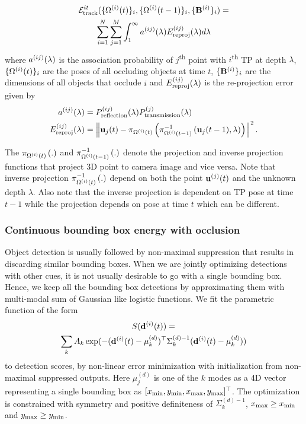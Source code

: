 \begin{multline}
  \mathcal{E}^{it}_{\text{track}}(\{ \Omega^{(i)}(t) \}_i, \{ \Omega^{(i)}(t-1) \}_i, \{\mathbf{B}^{(i)}\}_i ) = 
  \\
    \sum_{i=1}^{N} 
    \sum_{j = 1}^{M}
    \int_1^\infty a^{(ij)}(\lambda)E^{(ij)}_{\text{reproj}}(\lambda) d\lambda
\end{multline}
where $a^{(ij)}(\lambda)$ is the association probability of
$j$\textsuperscript{th} point with $i$\textsuperscript{th} TP at depth $\lambda$, $\{ \Omega^{(i)}(t) \}_i$ are the poses of all occluding objects at time $t$, $ \{ \mathbf{B}^{(i)} \}_i$ are the dimensions of all objects that occlude $i$
and $E^{(ij)}_{\text{reproj}}(\lambda)$ is the re-projection error given by
%
\begin{align}
  a^{(ij)}(\lambda) &= P^{(ij)}_{\text{reflection}}(\lambda)P^{(j)}_{\text{transmission}}(\lambda)\\
  E^{(ij)}_{\text{reproj}}(\lambda) &= \left\|\mathbf{u}_j(t) - \pi_{\Omega^{(i)}(t)}\left(\pi^{-1}_{\Omega^{(i)}(t-1)}\left(\mathbf{u}_j(t-1), \lambda\right)\right)\right\|^2 .
  \label{eq:reprojerror}
\end{align}

The  $\pi_{\Omega^{(i)}(t)}\left(.\right)$ and $\pi^{-1}_{\Omega^{(i)}(t-1)}\left(.\right)$ denote the projection and
inverse projection functions that project 3D point to camera image and vice
versa. Note that inverse projection $\pi^{-1}_{\Omega^{(i)}(t)}\left(.\right)$ depend on both the
point $\mathbf{u}^{(j)}(t)$ and the unknown depth $\lambda$. Also note that the inverse projection is dependent on TP pose at time $t-1$ while the projection depends on pose at time $t$ which can be different.

\subsubsection{Continuous bounding box energy with occlusion}

Object detection is usually followed by non-maximal suppression that results in
discarding similar bounding boxes. When we are jointly optimizing detections
with other cues, it is not usually desirable to go with a single bounding box.
Hence, we keep all the bounding box detections by approximating them with
multi-modal sum of Gaussian like logistic functions. We fit the parametric function of the form 
%
\begin{multline}
  S(\mathbf{d}^{(i)}(t)) = \\
  \sum_k A_k \exp(-(\mathbf{d}^{(i)}(t)-\mu^{(d)}_k)^\top \Sigma^{(d)-1}_k
  (\mathbf{d}^{(i)}(t)-\mu^{(d)}_k))
\end{multline}
%
to detection scores, by non-linear error minimization with initialization from
non-maximal suppressed outputs. Here $\mu^{(d)}_j$ is one of the $k$ modes as a
4D vector representing a single bounding box as $[x_{\text{min}}, y_{\text{min}}, x_{\text{max}},
y_{\text{max}}]^\top$. The optimization is constrained with symmetry and positive
definiteness of $\Sigma^{(d)-1}_k$, $x_{\text{max}} \ge x_{\text{min}}$ and $y_{\text{max}} \ge y_{\text{min}}$.

